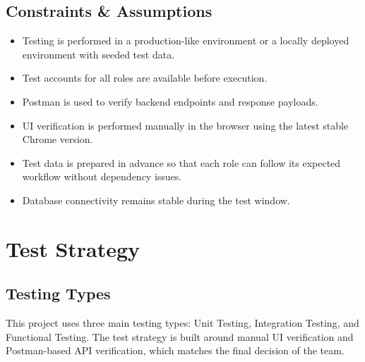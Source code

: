 \subsection{Constraints \& Assumptions}

\begin{itemize}
    \item Testing is performed in a production-like environment or a locally deployed environment with seeded test data.
    \item Test accounts for all roles are available before execution.
    \item Postman is used to verify backend endpoints and response payloads.
    \item UI verification is performed manually in the browser using the latest stable Chrome version.
    \item Test data is prepared in advance so that each role can follow its expected workflow without dependency issues.
    \item Database connectivity remains stable during the test window.
\end{itemize}

\section{Test Strategy}

\subsection{Testing Types}

This project uses three main testing types: Unit Testing, Integration Testing, and Functional Testing. The test strategy is built around manual UI verification and Postman-based API verification, which matches the final decision of the team.

